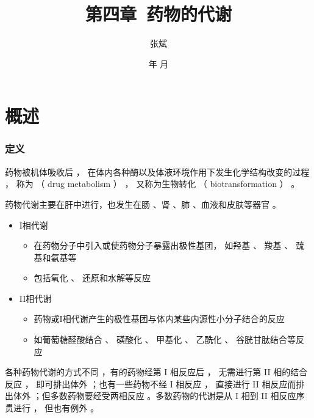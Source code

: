\documentclass[dvipsnames, svgnames, x11names]{beamer}
\title{第四章\ 药物的代谢}
\author{张斌}
\institute[理工系]{河北农业大学 理工系}
\date{\the\year 年 \the\month 月}
\begin{document}
	
	\begin{frame}
		\titlepage
		\thispagestyle{empty}
		\addtocounter{framenumber}{-1}
	\end{frame}


\begin{frame}{}
	\begin{center}
		{\Huge \cbf{目 \ 录}}
	\end{center}
	\tableofcontents[subsectionstyle=hide/hide/show]
	\thispagestyle{empty}
	\addtocounter{framenumber}{-1}
\end{frame}


\section{概述}


\begin{frame}
    \frametitle{定义}
    药物被机体吸收后 ， 在体内各种酶以及体液环境作用下发生化学结构改变的过程 ， 称为 （ drug metabolism ） ， 又称为生物转化 （ biotransformation ） 。 
    
    药物代谢主要在肝中进行，也发生在肠 、肾 、肺 、血液和皮肤等器官 。

    \begin{itemize}
      \item I相代谢
        \begin{itemize}
          \item 在药物分子中引入或使药物分子暴露出极性基团， 如羟基 、 羧基 、 巯基和氨基等
          \item 包括氧化 、 还原和水解等反应
        \end{itemize}
      \item II相代谢
        \begin{itemize}
          \item 药物或I相代谢产生的极性基团与体内某些内源性小分子结合的反应
          \item 如葡萄糖醛酸结合 、 磺酸化 、 甲基化 、 乙酰化 、 谷胱甘肽结合等反应
        \end{itemize}
    \end{itemize}
    各种药物代谢的方式不同 ，有的药物经第 I 相反应后 ， 无需进行第 II 相的结合反应 ， 即可排出体外 ；也有一些药物不经 I 相反应 ， 直接进行 II 相反应而排出体外 ；但多数药物要经受两相反应 。多数药物的代谢是从 I 相到 II 相反应序贯进行 ， 但也有例外 。 

    
\end{frame}
\end{document}

